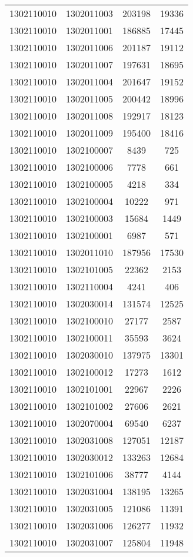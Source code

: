 \begin{longtable}[h]{llcc}
		1302110010 & 1302011003 & 203198 & 19336\\
		1302110010 & 1302011001 & 186885 & 17445\\
		1302110010 & 1302011006 & 201187 & 19112\\
		1302110010 & 1302011007 & 197631 & 18695\\
		1302110010 & 1302011004 & 201647 & 19152\\
		1302110010 & 1302011005 & 200442 & 18996\\
		1302110010 & 1302011008 & 192917 & 18123\\
		1302110010 & 1302011009 & 195400 & 18416\\
		1302110010 & 1302100007 & 8439 & 725\\
		1302110010 & 1302100006 & 7778 & 661\\
		1302110010 & 1302100005 & 4218 & 334\\
		1302110010 & 1302100004 & 10222 & 971\\
		1302110010 & 1302100003 & 15684 & 1449\\
		1302110010 & 1302100001 & 6987 & 571\\
		1302110010 & 1302011010 & 187956 & 17530\\
		1302110010 & 1302101005 & 22362 & 2153\\
		1302110010 & 1302110004 & 4241 & 406\\
		1302110010 & 1302030014 & 131574 & 12525\\
		1302110010 & 1302100010 & 27177 & 2587\\
		1302110010 & 1302100011 & 35593 & 3624\\
		1302110010 & 1302030010 & 137975 & 13301\\
		1302110010 & 1302100012 & 17273 & 1612\\
		1302110010 & 1302101001 & 22967 & 2226\\
		1302110010 & 1302101002 & 27606 & 2621\\
		1302110010 & 1302070004 & 69540 & 6237\\
		1302110010 & 1302031008 & 127051 & 12187\\
		1302110010 & 1302030012 & 133263 & 12684\\
		1302110010 & 1302101006 & 38777 & 4144\\
		1302110010 & 1302031004 & 138195 & 13265\\
		1302110010 & 1302031005 & 121086 & 11391\\
		1302110010 & 1302031006 & 126277 & 11932\\
		1302110010 & 1302031007 & 125804 & 11948\\

\end{longtable}
